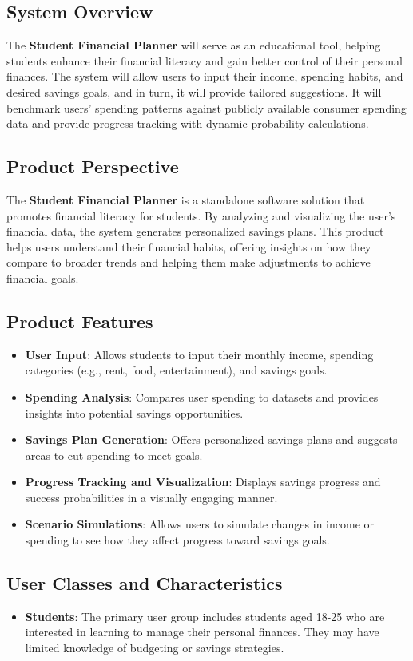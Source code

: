 \documentclass{article}
\begin{document}
\subsection{System Overview}
The \textbf{Student Financial Planner} will serve as an educational tool, helping students enhance their financial literacy and gain better control of their personal finances. The system will allow users to input their income, spending habits, and desired savings goals, and in turn, it will provide tailored suggestions. It will benchmark users' spending patterns against publicly available consumer spending data and provide progress tracking with dynamic probability calculations. 

\subsection{Product Perspective}
The \textbf{Student Financial Planner} is a standalone software solution that promotes financial literacy for students. By analyzing and visualizing the user's financial data, the system generates personalized savings plans. This product helps users understand their financial habits, offering insights on how they compare to broader trends and helping them make adjustments to achieve financial goals.

\subsection{Product Features}
\begin{itemize}
    \item \textbf{User Input}: Allows students to input their monthly income, spending categories (e.g., rent, food, entertainment), and savings goals.
    \item \textbf{Spending Analysis}: Compares user spending to datasets and provides insights into potential savings opportunities.
    \item \textbf{Savings Plan Generation}: Offers personalized savings plans and suggests areas to cut spending to meet goals.
    \item \textbf{Progress Tracking and Visualization}: Displays savings progress and success probabilities in a visually engaging manner.
    \item \textbf{Scenario Simulations}: Allows users to simulate changes in income or spending to see how they affect progress toward savings goals.
\end{itemize}

\subsection{User Classes and Characteristics}
\begin{itemize}
    \item \textbf{Students}: The primary user group includes students aged 18-25 who are interested in learning to manage their personal finances. They may have limited knowledge of budgeting or savings strategies.
\end{itemize}
\end{document}
